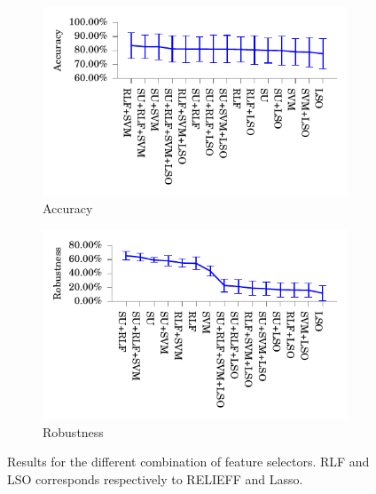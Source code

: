\documentclass[twoside,11pt]{article}
\begin{document}
\begin{figure}[!b]
\centering
\begin{subfigure}{.5\textwidth}
  \centering
  \includegraphics[width=1.07\textwidth]{images/Accuracy_of_the_different_combinations.pdf}
  \caption{Accuracy}
  \label{fig:combination_accuracy}
\end{subfigure}%
\begin{subfigure}{.5\textwidth}
  \centering
  \includegraphics[width=1.07\textwidth]{images/Robustness_of_the_different_combinations.pdf}
  \caption{Robustness}
  \label{fig:combination_robustness}
\end{subfigure}
\caption{Results for the different combination of feature selectors. RLF and LSO corresponds respectively to RELIEFF and Lasso.}
\label{fig:combination_results}
\end{figure}
\end{document}
